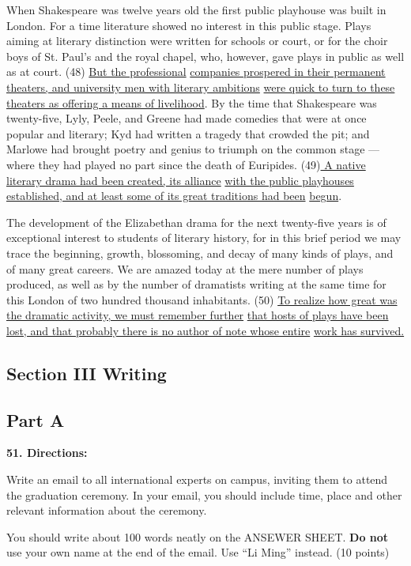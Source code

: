 \documentclass[UTF8,11pt]{ctexart}
\begin{document}
When Shakespeare was twelve years old the first public playhouse was built in London. For a time literature showed no interest in this public stage. Plays aiming at literary distinction were written for schools or court, or for the choir boys of St. Paul’s and the royal chapel, who, however, gave plays in public as well as at court. (48) \uline{But the professional} \uline{companies prospered in their permanent theaters, and university men with literary ambitions} \uline{were quick to turn to these theaters as offering a means of livelihood}. By the time that Shakespeare was twenty-five, Lyly, Peele, and Greene had made comedies that were at once popular and literary; Kyd had written a tragedy that crowded the pit; and Marlowe had brought poetry and genius to triumph on the common stage — where they had played no part since the death of Euripides. (49)\uline{ A native literary drama had been created, its alliance} \uline{with the public playhouses established, and at least some of its great traditions had been} \uline{begun}.


The development of the Elizabethan drama for the next twenty-five years is of exceptional interest to students of literary history, for in this brief period we may trace the beginning, growth, blossoming, and decay of many kinds of plays, and of many great careers. We are amazed today at the mere number of plays produced, as well as by the number of dramatists writing at the same time for this London of two hundred thousand inhabitants. (50) \uline{To realize how great was the dramatic activity, we must remember further} \uline{that hosts of plays have been lost, and that probably there is no author of note whose entire} \uline{work has survived.}


\subsection*{\textbf{Section III Writing}}


\subsection*{\textbf{Part A}}


\textbf{51. Directions:}


Write an email to all international experts on campus, inviting them to attend the graduation ceremony. In your email, you should include time, place and other relevant information about the ceremony.


You should write about 100 words neatly on the ANSEWER SHEET. \textbf{Do not }use your own name at the end of the email. Use “Li Ming” instead. (10 points)
\end{document}
